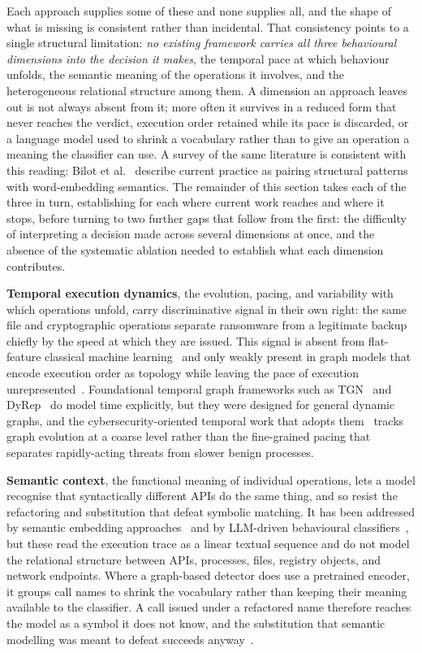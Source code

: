 \documentclass[%
    BCOR=10mm,
    DIV=13,
    toc=bibliography,
    toc=listof,
    oneside,
    12pt,
]{scrbook}
\begin{document}
Each approach supplies some of these and none supplies all, and the shape of
what is missing is consistent rather than incidental. That consistency points
to a single structural limitation: \emph{no existing framework carries all
three behavioural dimensions into the decision it makes}, the temporal pace at
which behaviour unfolds, the semantic meaning of the operations it involves,
and the heterogeneous relational structure among them. A dimension an approach
leaves out is not always absent from it; more often it survives in a reduced
form that never reaches the verdict, execution order retained while its pace
is discarded, or a language model used to shrink a vocabulary rather than to
give an operation a meaning the classifier can use. A survey of the same
literature is consistent with this reading: Bilot et
al.~\cite{bilot2024survey} describe current practice as pairing structural
patterns with word-embedding semantics. The remainder of this section takes
each of the three in turn, establishing for each where current work reaches
and where it stops, before turning to two further gaps that follow from the
first: the difficulty of interpreting a decision made across several
dimensions at once, and the absence of the systematic ablation needed to
establish what each dimension contributes.

\textbf{Temporal execution dynamics}, the evolution, pacing, and variability with
which operations unfold, carry discriminative signal in their own right: the same
file and cryptographic operations separate ransomware from a legitimate backup
chiefly by the speed at which they are issued. This signal is absent from
flat-feature classical machine learning~\cite{ucci2019survey, ye2017survey} and only
weakly present in graph models that encode execution order as topology while
leaving the pace of execution unrepresented~\cite{amer2025graphshield,
bilot2024survey}. Foundational temporal
graph frameworks such as TGN~\cite{tgn2020} and DyRep~\cite{dyrep2019} do model time
explicitly, but they were designed for general dynamic graphs, and the
cybersecurity-oriented temporal work that adopts them~\cite{guopope2023,
haghshenas2023temporal} tracks graph evolution at a coarse level rather than the
fine-grained pacing that separates rapidly-acting threats from slower benign
processes.

\textbf{Semantic context}, the functional meaning of individual operations, lets a
model recognise that syntactically different APIs do the same thing, and so resist
the refactoring and substitution that defeat symbolic matching. It has been
addressed by semantic embedding approaches~\cite{reimers2019sbert,
lee2024gecko, mpnet2020} and by LLM-driven behavioural
classifiers~\cite{perera2023beacon}, but these read the execution trace as a
linear textual sequence and do not model the relational structure between APIs,
processes, files, registry objects, and network endpoints. Where a graph-based
detector does use a pretrained encoder, it groups call names to shrink the
vocabulary rather than keeping their meaning available to the classifier. A
call issued under a refactored name therefore reaches the model as a symbol it
does not know, and the substitution that semantic modelling was meant to defeat
succeeds anyway~\cite{amer2025graphshield}.
\end{document}
